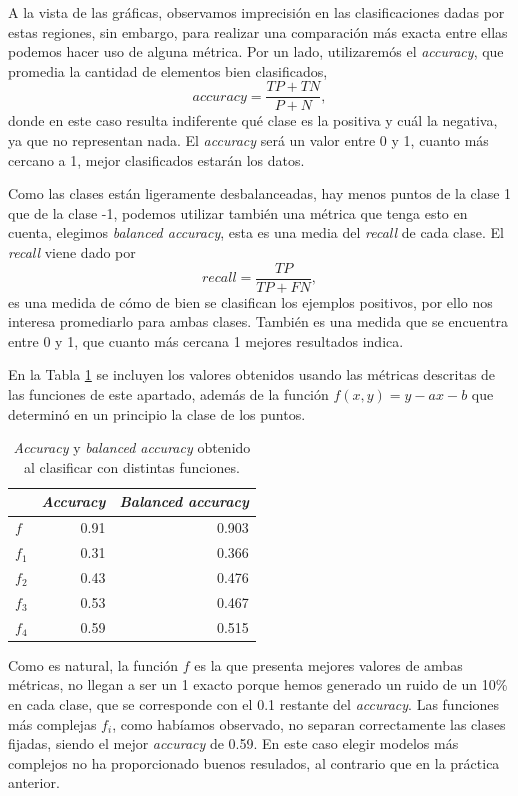 \documentclass[a4paper, 20pt]{article}
\begin{document}
A la vista de las gráficas, observamos imprecisión en las clasificaciones dadas por estas regiones, sin embargo, para realizar una comparación más exacta entre ellas podemos hacer uso de alguna métrica. Por un lado, utilizaremós el \textit{accuracy}, que promedia la cantidad de elementos bien clasificados,\[
accuracy = \frac{TP + TN}{P + N},
\]
donde en este caso resulta indiferente qué clase es la positiva y cuál la negativa, ya que no representan nada. El \textit{accuracy} será un valor entre 0 y 1, cuanto más cercano a 1, mejor clasificados estarán los datos.

Como las clases están ligeramente desbalanceadas, hay menos puntos de la clase 1 que de la clase -1, podemos utilizar también una métrica que tenga esto en cuenta, elegimos \textit{balanced accuracy}, esta es una media del \textit{recall} de cada clase. El \textit{recall} viene dado por \[
recall = \frac{TP}{TP+FN},
\]
es una medida de cómo de bien se clasifican los ejemplos positivos, por ello nos interesa promediarlo para ambas clases. También es una medida que se encuentra entre 0 y 1, que cuanto más cercana 1 mejores resultados indica.

En la Tabla \ref{tab:13} se incluyen los valores obtenidos usando las métricas descritas de las funciones de este apartado, además de la función $f(x,y) = y -ax -b$ que determinó en un principio la clase de los puntos.

\begin{table}[H]
\large
\centering
\caption{\textit{Accuracy} y \textit{balanced accuracy} obtenido al clasificar con distintas funciones.}
\label{tab:13}
\begin{tabular}{lrr}
\toprule
& \textit{Accuracy} & \textit{Balanced accuracy}\\ \midrule
$f$ & 0.91 & 0.903\\
$f_1$ & 0.31 & 0.366\\
$f_2$ & 0.43 & 0.476\\
$f_3$ & 0.53 & 0.467\\
$f_4$ & 0.59 & 0.515\\
\bottomrule
\end{tabular}
\end{table}

Como es natural, la función $f$ es la que presenta mejores valores de ambas métricas, no llegan a ser un 1 exacto porque hemos generado un ruido de un 10\% en cada clase, que se corresponde con el 0.1 restante del \textit{accuracy}. Las funciones más complejas $f_i$, como habíamos observado, no separan correctamente las clases fijadas, siendo el mejor \textit{accuracy} de 0.59. En este caso elegir modelos más complejos no ha proporcionado buenos resulados, al contrario que en la práctica anterior.
\end{document}
